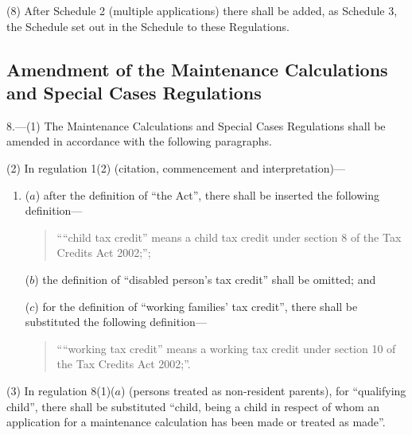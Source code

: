 \documentclass[12pt,a4paper]{article}
\begin{document}
(8) After Schedule 2 (multiple applications) there shall be added, as Schedule 3, the Schedule set out in the Schedule to these Regulations.

\subsection[8. Amendment of the Maintenance Calculations and Special Cases Regulations]{\sloppy Amendment of the Maintenance Calculations and Special Cases Regulations}

8.---(1)  The Maintenance Calculations and Special Cases Regulations shall be amended in accordance with the following paragraphs.

(2) In regulation 1(2) (citation, commencement and interpretation)—
\begin{enumerate}\item[]
($a$) after the definition of “the Act”, there shall be inserted the following definition—
\begin{quotation}
““child tax credit” means a child tax credit under section 8 of the Tax Credits Act 2002;”;
\end{quotation}

($b$) the definition of “disabled person’s tax credit” shall be omitted; and

($c$) for the definition of “working families' tax credit”, there shall be substituted the following definition—
\begin{quotation}
““working tax credit” means a working tax credit under section 10 of the Tax Credits Act 2002;”.
\end{quotation}
\end{enumerate}

(3) In regulation 8(1)($a$)  (persons treated as non-resident parents), for “qualifying child”, there shall be substituted “child, being a child in respect of whom an application for a maintenance calculation has been made or treated as made”.
\end{document}
